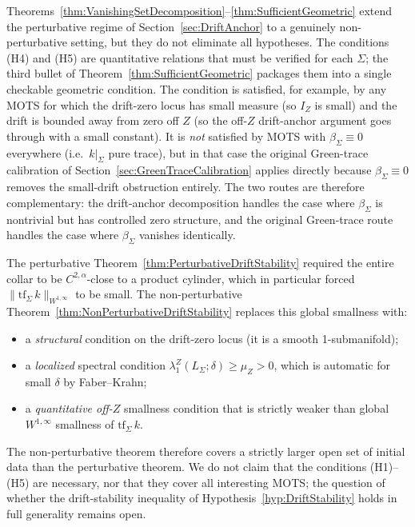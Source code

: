 \begin{remark}\label{rem:VanishingSetHonest}
Theorems~\ref{thm:VanishingSetDecomposition}--\ref{thm:SufficientGeometric} extend the perturbative regime of Section~\ref{sec:DriftAnchor} to a genuinely non-perturbative setting, but they do not eliminate all hypotheses. The conditions (H4) and (H5) are quantitative relations that must be verified for each $\Sigma$; the third bullet of Theorem~\ref{thm:SufficientGeometric} packages them into a single checkable geometric condition. The condition is satisfied, for example, by any MOTS for which the drift-zero locus has small measure (so $I_Z$ is small) and the drift is bounded away from zero off $Z$ (so the off-$Z$ drift-anchor argument goes through with a small constant). It is \emph{not} satisfied by MOTS with $\beta_\Sigma\equiv0$ everywhere (i.e.\ $k|_\Sigma$ pure trace), but in that case the original Green-trace calibration of Section~\ref{sec:GreenTraceCalibration} applies directly because $\beta_\Sigma\equiv0$ removes the small-drift obstruction entirely. The two routes are therefore complementary: the drift-anchor decomposition handles the case where $\beta_\Sigma$ is nontrivial but has controlled zero structure, and the original Green-trace route handles the case where $\beta_\Sigma$ vanishes identically.
\end{remark}

\begin{remark}\label{rem:VsPerturbative}
The perturbative Theorem~\ref{thm:PerturbativeDriftStability} required the entire collar to be $C^{2,\alpha}$-close to a product cylinder, which in particular forced $\|\mathrm{tf}_\Sigma\,k\|_{W^{1,\infty}}$ to be small. The non-perturbative Theorem~\ref{thm:NonPerturbativeDriftStability} replaces this global smallness with:
\begin{itemize}
    \item a \emph{structural} condition on the drift-zero locus (it is a smooth 1-submanifold);
    \item a \emph{localized} spectral condition $\lambda_1^Z(L_\Sigma;\delta)\ge\mu_Z>0$, which is automatic for small $\delta$ by Faber--Krahn;
    \item a \emph{quantitative off-$Z$} smallness condition that is strictly weaker than global $W^{1,\infty}$ smallness of $\mathrm{tf}_\Sigma\,k$.
\end{itemize}
The non-perturbative theorem therefore covers a strictly larger open set of initial data than the perturbative theorem. We do not claim that the conditions (H1)--(H5) are necessary, nor that they cover all interesting MOTS; the question of whether the drift-stability inequality of Hypothesis~\ref{hyp:DriftStability} holds in full generality remains open.
\end{remark}

